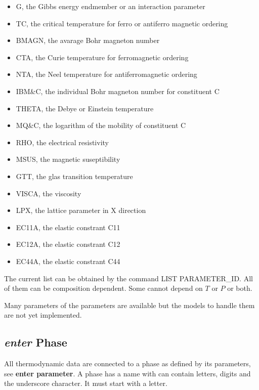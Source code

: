 \documentclass[12pt]{article}
\begin{document}
\begin{itemize}
\item G, the Gibbs energy endmember or an interaction parameter
\item TC, the critical temperature for ferro or antiferro magnetic ordering
\item BMAGN, the avarage Bohr magneton number
\item CTA, the Curie temperature for ferromagnetic ordering
\item NTA, the Neel temperature for antiferromagnetic ordering
\item IBM\&C, the individual Bohr magneton number for constituent C
\item THETA, the Debye or Einstein temperature
\item MQ\&C, the logarithm of the mobility of constituent C
\item RHO, the electrical resistivity
\item MSUS, the magnetic suseptibility
\item GTT, the glas transition temperature
\item VISCA, the viscosity
\item LPX, the lattice parameter in X direction
\item EC11A, the elastic constrant C11
\item EC12A, the elastic constrant C12
\item EC44A, the elastic constrant C44
\end{itemize}

The current list can be obtained by the command LIST PARAMETER\_ID.
All of them can be composition dependent.  Some cannot depend on $T$
or $P$ or both.  

Many parameters of the parameters are available but the models to
handle them are not yet implemented.

\subsection{{\em enter} Phase}

All thermodynamic data are connected to a phase as defined by its
parameters, see {\bf enter parameter}.  A phase has a name with can
contain letters, digits and the underscore character.  It must start
with a letter.
\end{document}
